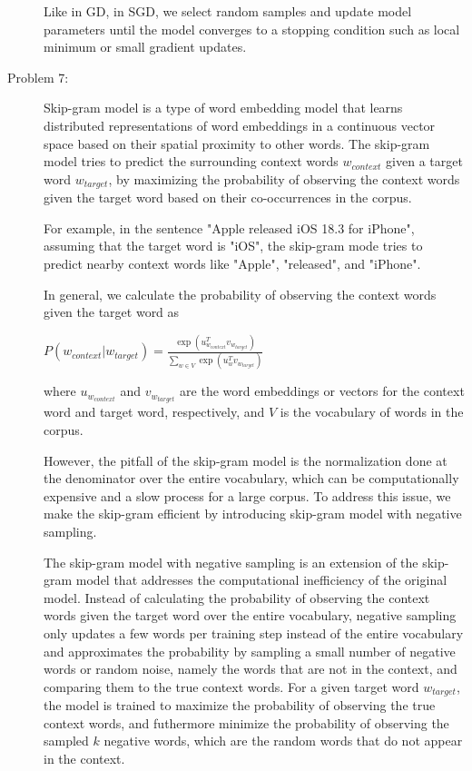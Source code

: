 \documentclass[12pt]{article}
\begin{document}
\begin{description}
  Like in GD, in SGD, we select random samples and update model parameters until the model converges to a stopping condition such as local minimum or small gradient updates.

  \pagebreak

  \item[Problem 7:] \hfill %
  
  Skip-gram model is a type of word embedding model that learns distributed representations of word embeddings in a continuous vector space based on their spatial proximity 
  to other words. The skip-gram model tries to predict the surrounding context words $w_{context}$ given a target word $w_{target}$, by maximizing the probability of observing
  the context words given the target word based on their co-occurrences in the corpus. 

  For example, in the sentence "Apple released iOS 18.3 for iPhone", assuming that the target word is "iOS", the skip-gram mode tries to predict nearby context words like 
  "Apple", "released", and "iPhone".

  In general, we calculate the probability of observing the context words given the target word as

  \begin{center}
    $\displaystyle{P(w_{context} | w_{target}) = \frac{\exp({u_{w_{context}}^T v_{w_{target}}})}{\sum_{w \in V} \exp({u_{w}^T v_{w_{target}}})}}$
  \end{center}

  where $u_{w_{context}}$ and $v_{w_{target}}$ are the word embeddings or vectors for the context word and target word, respectively, and $V$ is the vocabulary of words in the corpus.

  However, the pitfall of the skip-gram model is the normalization done at the denominator over the entire vocabulary, which can be computationally expensive and a slow process 
  for a large corpus. To address this issue, we make the skip-gram efficient by introducing skip-gram model with negative sampling.

  The skip-gram model with negative sampling is an extension of the skip-gram model that addresses the computational inefficiency of the original model. Instead of calculating
  the probability of observing the context words given the target word over the entire vocabulary, negative sampling only updates a few words per training step instead of the 
  entire vocabulary and approximates the probability by sampling a small number of negative words or random noise, namely the words that are not in the context, and comparing 
  them to the true context words. For a given target word $w_{target}$, the model is trained to maximize the probability of observing the true context words, and futhermore 
  minimize the probability of observing the sampled $k$ negative words, which are the random words that do not appear in the context.


\end{description}
\end{document}
